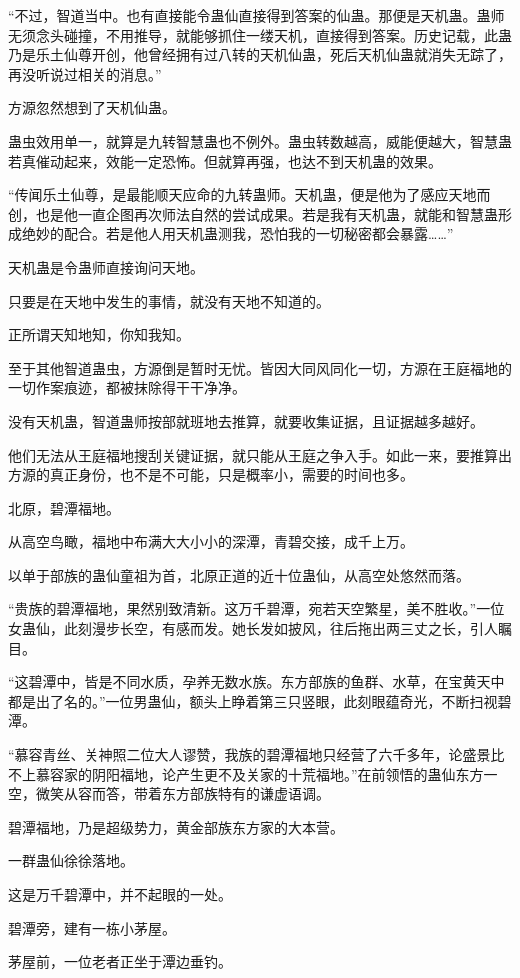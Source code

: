 \begin{this_body}
“不过，智道当中。也有直接能令蛊仙直接得到答案的仙蛊。那便是天机蛊。蛊师无须念头碰撞，不用推导，就能够抓住一缕天机，直接得到答案。历史记载，此蛊乃是乐土仙尊开创，他曾经拥有过八转的天机仙蛊，死后天机仙蛊就消失无踪了，再没听说过相关的消息。”

方源忽然想到了天机仙蛊。

蛊虫效用单一，就算是九转智慧蛊也不例外。蛊虫转数越高，威能便越大，智慧蛊若真催动起来，效能一定恐怖。但就算再强，也达不到天机蛊的效果。

“传闻乐土仙尊，是最能顺天应命的九转蛊师。天机蛊，便是他为了感应天地而创，也是他一直企图再次师法自然的尝试成果。若是我有天机蛊，就能和智慧蛊形成绝妙的配合。若是他人用天机蛊测我，恐怕我的一切秘密都会暴露……”

天机蛊是令蛊师直接询问天地。

只要是在天地中发生的事情，就没有天地不知道的。

正所谓天知地知，你知我知。

至于其他智道蛊虫，方源倒是暂时无忧。皆因大同风同化一切，方源在王庭福地的一切作案痕迹，都被抹除得干干净净。

没有天机蛊，智道蛊师按部就班地去推算，就要收集证据，且证据越多越好。

他们无法从王庭福地搜刮关键证据，就只能从王庭之争入手。如此一来，要推算出方源的真正身份，也不是不可能，只是概率小，需要的时间也多。

北原，碧潭福地。

从高空鸟瞰，福地中布满大大小小的深潭，青碧交接，成千上万。

以单于部族的蛊仙童祖为首，北原正道的近十位蛊仙，从高空处悠然而落。

“贵族的碧潭福地，果然别致清新。这万千碧潭，宛若天空繁星，美不胜收。”一位女蛊仙，此刻漫步长空，有感而发。她长发如披风，往后拖出两三丈之长，引人瞩目。

“这碧潭中，皆是不同水质，孕养无数水族。东方部族的鱼群、水草，在宝黄天中都是出了名的。”一位男蛊仙，额头上睁着第三只竖眼，此刻眼蕴奇光，不断扫视碧潭。

“慕容青丝、关神照二位大人谬赞，我族的碧潭福地只经营了六千多年，论盛景比不上慕容家的阴阳福地，论产生更不及关家的十荒福地。”在前领悟的蛊仙东方一空，微笑从容而答，带着东方部族特有的谦虚语调。

碧潭福地，乃是超级势力，黄金部族东方家的大本营。

一群蛊仙徐徐落地。

这是万千碧潭中，并不起眼的一处。

碧潭旁，建有一栋小茅屋。

茅屋前，一位老者正坐于潭边垂钓。


\end{this_body}
